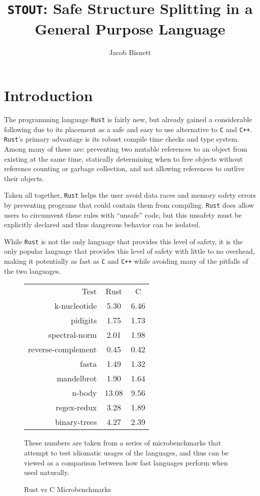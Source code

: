 \documentclass[12pt,oneside]{book}
\newcommand{\rustname}{{\texttt{Rust}}}
\def \rust {\rustname{}\xspace}
\newcommand{\cname}{{\texttt{C}}}
\def \c {\cname{}\xspace}
\newcommand{\cppname}{{\texttt{C++}}}
\def \cpp {\cppname{}\xspace}
\newcommand{\projectname}{{\texttt{STOUT}}}
\def \name{\projectname\xspace}
\begin{document}
\title{\name: Safe Structure Splitting in a General Purpose Language}
\author{Jacob Bisnett}
\maketitle
\pagestyle{fancy}
\chapter{Introduction}
\doublespacing
\label{sec:intro}

The programming language \rust is fairly new, but already gained a considerable
following due to its placement as a safe and easy to use alternative to \c and
\cpp. \rust's primary advantage is its robust compile time checks and type
system. Among many of these are:
preventing two mutable references to an object from existing at the same time, 
statically determining when to free objects without reference counting or
garbage collection,
and not allowing references to outlive their objects.

Taken all together, \rust helps the user avoid data races and memory safety
errors by preventing programs that could contain them from compiling.
\rust does allow users to circumvent these rules with ``unsafe'' code,
but this unsafety must be explicitly declared and thus dangerous behavior can be
isolated.

While \rust is not the only language that provides this level of safety, it is
the only popular language that provides this level of safety with little to no overhead,
making it potentially as fast as \c and \cpp while avoiding many of the
pitfalls of the two languages.

\begin{figure}
  \centering
\begin{tabular}{r|c|c}
  Test&Rust&C\\
  k-nucleotide&5.30&6.46\\
  pidigits&1.75&1.73\\
  spectral-norm&2.01&1.98\\
  reverse-complement&0.45&0.42\\
  fasta&1.49&1.32\\
  mandelbrot&1.90&1.64\\
  n-body&13.08&9.56\\
  regex-redux&3.28&1.89\\
  binary-trees&4.27&2.39\\
\end{tabular}

  These numbers are taken from a series of microbenchmarks that attempt to 
  test idiomatic usages of the languages, and thus can be viewed as a comparison
  between how fast languages perform when used naturally.\cite{bench}
  \caption{Rust vs C Microbenchmarks}
  \label{fig:bench}
\end{figure}
\end{document}
